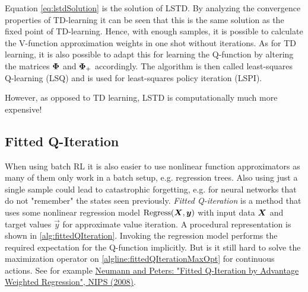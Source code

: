			Equation \eqref{eq:lstdSolution} is the solution of LSTD. By analyzing the convergence properties of TD-learning it can be seen that this is the same solution as the fixed point of TD-learning. Hence, with enough samples, it is possible to calculate the V-function approximation weights in one shot without iterations. As for TD learning, it is also possible to adapt this for learning the Q-function by altering the matrices \( \bm{\Phi} \) and \( \bm{\Phi}_+ \) accordingly. The algorithm is then called least-squares Q-learning (LSQ) and is used for least-squares policy iteration (LSPI).

			However, as opposed to TD learning, LSTD is computationally much more expensive!

		\subsection{Fitted Q-Iteration}
			When using batch RL it is also easier to use nonlinear function approximators as many of them only work in a batch setup, e.g. regression trees. Also using just a single sample could lead to catastrophic forgetting, e.g. for neural networks that do not "remember" the states seen previously. \emph{Fitted Q-iteration} is a method that uses some nonlinear regression model \( \mathrm{Regress}(\bm{X}, \bm{y}) \) with input data \(\bm{X}\) and target values \(\vec{y}\) for approximate value iteration. A procedural representation is shown in \autoref{alg:fittedQIteration}. Invoking the regression model performs the required expectation for the Q-function implicitly. But is it still hard to solve the maximization operator on \autoref{algline:fittedQIterationMaxOpt} for continuous actions. See for example \href{https://proceedings.neurips.cc/paper/2008/hash/f79921bbae40a577928b76d2fc3edc2a-Abstract.html}{Neumann and Peters: "Fitted Q-Iteration by Advantage Weighted Regression", NIPS (2008)}.

